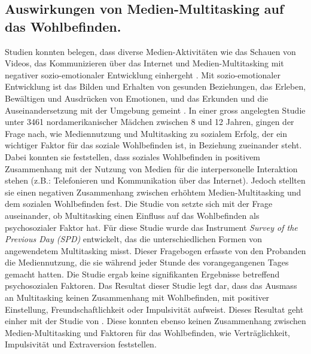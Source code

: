 \subsection{Auswirkungen von Medien-Multitasking auf das Wohlbefinden.} 
Studien konnten belegen, dass diverse Medien-Aktivitäten wie das Schauen von Videos, das Kommunizieren über das Internet und Medien-Multitasking mit negativer sozio-emotionaler Entwicklung einhergeht \cite{Funk1996, Rideout2010, Pea2012}. Mit sozio-emotionaler Entwicklung ist das Bilden und Erhalten von gesunden Beziehungen, das Erleben, Bewältigen und Ausdrücken von Emotionen, und das Erkunden und die Auseinandersetzung mit der Umgebung gemeint \cite{Hymes1952, Lerner2000}. In einer gross angelegten Studie unter 3461 nordamerikanischer Mädchen zwischen 8 und 12 Jahren, gingen  der Frage nach, wie Mediennutzung und Multitasking zu sozialem Erfolg, der ein wichtiger Faktor für das soziale Wohlbefinden ist, in Beziehung zueinander steht. Dabei konnten sie feststellen, dass soziales Wohlbefinden in positivem Zusammenhang mit der Nutzung von Medien für die interpersonelle Interaktion stehen (z.B.: Telefonieren und Kommunikation über das Internet). Jedoch stellten sie einen negativen Zusammenhang zwischen erhöhtem Medien-Multitasking und dem sozialen Wohlbefinden fest. Die Studie von  setzte sich mit der Frage auseinander, ob Multitasking einen Einfluss auf das Wohlbefinden als psychosozialer Faktor hat. Für diese Studie wurde das Instrument \textit{Survey of the Previous Day (SPD)} entwickelt, das die unterschiedlichen Formen von angewendetem Multitasking misst. Dieser Fragebogen erfasste von den Probanden die Mediennutzung, die sie während jeder Stunde des vorangegangenen Tages gemacht hatten. Die Studie ergab keine signifikanten Ergebnisse betreffend psychosozialen Faktoren. Das Resultat dieser Studie legt dar, dass das Ausmass an Multitasking keinen Zusammenhang mit Wohlbefinden, mit positiver Einstellung, Freundschaftlichkeit oder Impulsivität aufweist. Dieses Resultat geht einher mit der Studie von . Diese konnten ebenso keinen Zusammenhang zwischen Medien-Multitasking und Faktoren für das Wohlbefinden, wie Verträglichkeit, Impulsivität und Extraversion feststellen.

